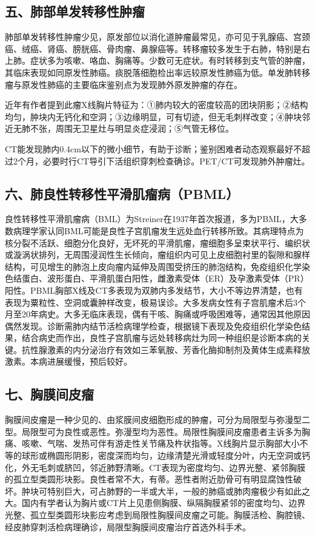 \subsection{五、肺部单发转移性肿瘤}

肺部单发转移性肿瘤少见，原发部位以消化道肿瘤最常见，亦可见于乳腺癌、宫颈癌、绒癌、肾癌、膀胱癌、骨肉瘤、鼻腺癌等。转移瘤较多发生于右肺，特别是右上肺。症状多为咳嗽、咯血、胸痛等。少数可无症状。有时转移到支气管的肿瘤，其临床表现如同原发性肺癌。痰脱落细胞检出率远较原发性肺癌为低。单发肺转移瘤与原发性肺癌的主要临床鉴别点为发现肺外原发肿瘤的存在。

近年有作者提到此瘤X线胸片特征为：①肺内较大的密度较高的团块阴影；②结构均匀，肿块内无钙化和空洞；③边缘明显，可有切迹，但无毛刺样改变；④肿块邻近无肺不张，周围无卫星灶与明显炎症浸润；⑤气管无移位。

CT能发现肺内0.4cm以下的微小细节，有助于诊断；鉴别困难者动态观察最好不超过2个月，必要时行CT导引下活组织穿刺检查确诊。PET/CT可发现肺外肿瘤灶。

\subsection{六、肺良性转移性平滑肌瘤病（PBML）}

良性转移性平滑肌瘤病（BML）为Streiner在1937年首次报道，多为PBML，大多数病理学家认同BML可能是良性子宫肌瘤发生远处血行转移所致。其病理特点为核分裂不活跃、细胞分化良好，无坏死的平滑肌瘤，瘤细胞多呈束状平行、编织状或漩涡状排列，无周围浸润性生长倾向，瘤组织内可见上皮细胞衬里的裂隙和腺样结构，可见增生的肺泡上皮向瘤内延伸及周围受挤压的肺泡结构，免疫组织化学染色结蛋白、波形蛋白、平滑肌蛋白阳性，雌激素受体（ER）及孕激素受体（PR）阳性。PBML胸部X线及CT多表现为双肺内多发结节，大小不等边界清楚，也有表现为粟粒性、空洞或囊肿样改变，极易误诊。大多发病女性有子宫肌瘤术后3个月至20年病史。大多无临床表现，偶有干咳、胸痛或呼吸困难等，通常因其他原因偶然发现。诊断需肺内结节活检病理学检查，根据镜下表现及免疫组织化学染色结果，结合病史而作出，良性子宫肌瘤与远处转移病灶为同一种组织是诊断本病的关键。抗性腺激素的内分泌治疗有效如三苯氧胺、芳香化酶抑制剂及黄体生成素释放激素。本病进展缓慢，预后较好。

\subsection{七、胸膜间皮瘤}

胸膜间皮瘤是一种少见的、由浆膜间皮细胞形成的肿瘤，可分为局限型与弥漫型二型。局限型可为良性或恶性。弥漫型均为恶性。局限性胸膜间皮瘤患者主诉多为胸痛、咳嗽、气喘、发热可伴有游走性关节痛及杵状指等。X线胸片显示胸部大小不等的球形或椭圆形阴影，密度深而均匀，边缘清楚光滑或轻度分叶，内无空洞或钙化，外无毛刺或脐凹，邻近肺野清晰。CT表现为密度均匀、边界光整、紧邻胸膜的孤立型类圆形块影。良性者常不大，有蒂。恶性者附近肋骨可有明显腐蚀性破坏。肿块可特别巨大，可占肺野的一半或大半，一般的肺癌或肺肉瘤极少有如此之大。国内有学者认为胸片或CT片上见患侧胸膜、纵隔胸膜紧邻的密度均匀、边界光整、孤立型类圆形块影应考虑到局限性胸膜间皮瘤之可能。胸膜活检、胸腔镜、经皮肺穿刺活检病理确诊，局限型胸膜间皮瘤治疗首选外科手术。

